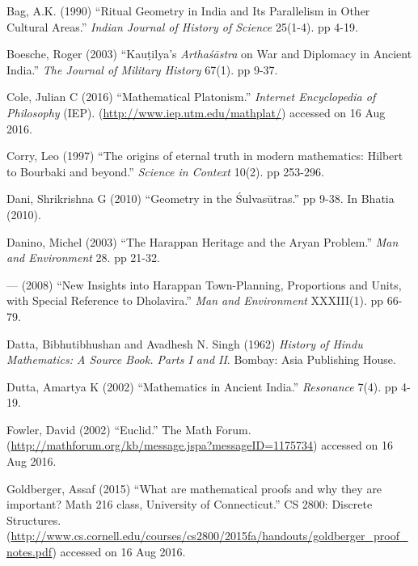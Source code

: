 \begin{thebibliography}{99}
\itemsep=2pt
Bag, A.K. (1990) ``Ritual Geometry in India and Its Parallelism in Other Cultural Areas.'' {\sl Indian Journal of History of Science} 25(1-4). pp 4-19.


Boesche, Roger (2003) ``Kauṭilya's {\sl Arthaśāstra} on War and Diplomacy in Ancient India.'' {\sl The Journal of Military History} 67(1). pp 9-37.

Cole, Julian C (2016) ``Mathematical Platonism.'' {\sl Internet Encyclopedia of Philosophy} (IEP). (\url{http://www.iep.utm.edu/mathplat/})\break 
accessed on 16 Aug 2016.

Corry, Leo (1997) ``The origins of eternal truth in modern mathematics: Hilbert to Bourbaki and beyond.'' {\sl Science in Context} 10(2). pp 253-296.

Dani, Shrikrishna G (2010) ``Geometry in the Śulvasūtras.'' pp 9-38. In Bhatia (2010).

Danino, Michel (2003) ``The Harappan Heritage and the Aryan Problem.'' {\sl Man and Environment} 28. pp 21-32.

--- (2008) ``New Insights into Harappan Town-Planning, Proportions and Units, with Special Reference to Dholavira.'' {\sl Man and Environment} XXXIII(1). pp 66-79.

Datta, Bibhutibhushan and Avadhesh N. Singh (1962) {\sl History of Hindu Mathematics: A Source Book. Parts I and II}. Bombay: Asia Publishing House.

Dutta, Amartya K (2002) ``Mathematics in Ancient India.'' {\sl Resonance} 7(4). pp 4-19.

Fowler, David (2002) ``Euclid.'' The Math Forum. (\url{http://mathforum.org/kb/message.jspa?messageID=1175734}) accessed on 16 Aug 2016.

Goldberger, Assaf (2015) ``What are mathematical proofs and why they are important? Math 216 class, University of Connecticut.'' CS 2800: Discrete Structures. (\url{http://www.cs.cornell.edu/courses/cs2800/2015fa/handouts/goldberger_proof_notes.pdf}) accessed on 16 Aug 2016.


\end{thebibliography}
